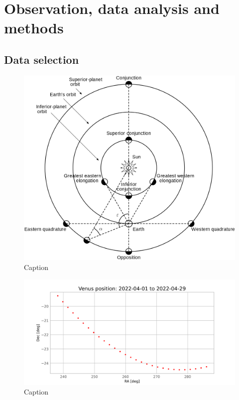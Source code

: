 \section{Observation, data analysis and methods}

    \subsection{Data selection}
    \begin{figure}[H]
        \centering
        \includegraphics[width = 12cm]{report/Figures/methods/Positional_astronomy.png}
        \caption{Caption}
        \label{elongation}
    \end{figure}
    
    \begin{figure}[H]
        \centering
        \includegraphics[width = 12cm]{report/Figures/methods/Venus_position.png}
        \caption{Caption}
        \label{venus_pos}
    \end{figure}
    
